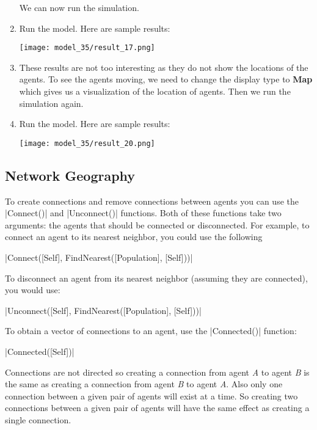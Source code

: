 \documentclass[]{memoir}
\makeatletter
\newcommand{\FunctionTok}[1]{\textcolor[rgb]{0.02,0.16,0.49}{{#1}}}
\newcommand{\NormalTok}[1]{{#1}}
\def\maxwidth{\ifdim\Gin@nat@width>\linewidth\linewidth
\else\Gin@nat@width\fi}
\let\Oldincludegraphics\includegraphics
\renewcommand{\includegraphics}[1]{\Oldincludegraphics[width=\maxwidth]{#1}}
\makeatother
\begin{document}
\begin{oframed}
\begin{enumerate}
We can now run the simulation.


\item Run the model. Here are sample results:\par \begin{minipage}{\linewidth}  \centering \texttt{[image: model\_35/result\_17.png]}
\end{minipage}
\item 

These results are not too interesting as they do not show the locations of the agents. To see the agents moving, we need to change the display type to \textbf{Map} which gives us a visualization of the location of agents. Then we run the simulation again.


\item Run the model. Here are sample results:\par \begin{minipage}{\linewidth}  \centering \texttt{[image: model\_35/result\_20.png]}
\end{minipage}

\end{enumerate} \end{oframed}

\subsection{Network Geography}

To create connections and remove connections between agents you can use
the |\FunctionTok{Connect}\NormalTok{()}| and
|\FunctionTok{Unconnect}\NormalTok{()}| functions. Both of these
functions take two arguments: the agents that should be connected or
disconnected. For example, to connect an agent to its nearest neighbor,
you could use the following

|\FunctionTok{Connect}\NormalTok{([Self], }\FunctionTok{FindNearest}\NormalTok{([Population], [Self]))}|

To disconnect an agent from its nearest neighbor (assuming they are
connected), you would use:

|\FunctionTok{Unconnect}\NormalTok{([Self], }\FunctionTok{FindNearest}\NormalTok{([Population], [Self]))}|

To obtain a vector of connections to an agent, use the
|\FunctionTok{Connected}\NormalTok{()}| function:

|\FunctionTok{Connected}\NormalTok{([Self])}|

Connections are not directed so creating a connection from agent
\emph{A} to agent \emph{B} is the same as creating a connection from
agent \emph{B} to agent \emph{A}. Also only one connection between a
given pair of agents will exist at a time. So creating two connections
between a given pair of agents will have the same effect as creating a
single connection.
\end{document}
